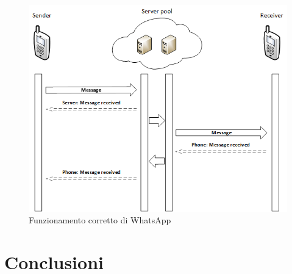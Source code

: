 \documentclass[a4paper,11pt]{book}
\begin{document}
\begin{figure}[!ht]
\centering
\includegraphics[scale = 0.8]{true_lan.png}
\caption{Funzionamento corretto di WhatsApp}
\label{fig:lan}
\end{figure}



\chapter{Conclusioni}
\end{document}
